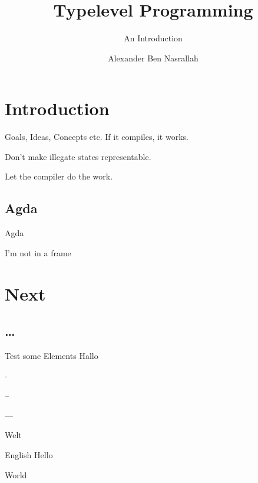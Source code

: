 \documentclass[ignorenonframetext, aspectratio=169]{beamer}
\author{Alexander Ben Nasrallah}
\institute{SerNet GmbH}
\title{\textrm{Typelevel Programming}}
\subtitle{An Introduction}
\begin{document}
\frame{\titlepage}

\begin{frame}
	\tableofcontents[hideallsubsections]
\end{frame}

\section{Introduction}
\frame{\sectionpage}

\begin{frame}{Goals, Ideas, Concepts etc.}
If it compiles, it works.

Don't make illegate states representable.

Let the compiler do the work.
\end{frame}

\subsection{Agda}
\begin{frame}{Agda}
	
\end{frame}

I'm not in a frame

\section{Next}
\frame{\sectionpage}

\subsection{…}
\frame{\sectionpage}


\begin{frame}{Test some Elements}
	Hallo

	-

	--

	---

	Welt
	\begin{block}{English}
		Hello

		World
	\end{block}
\end{frame}
\end{document}
